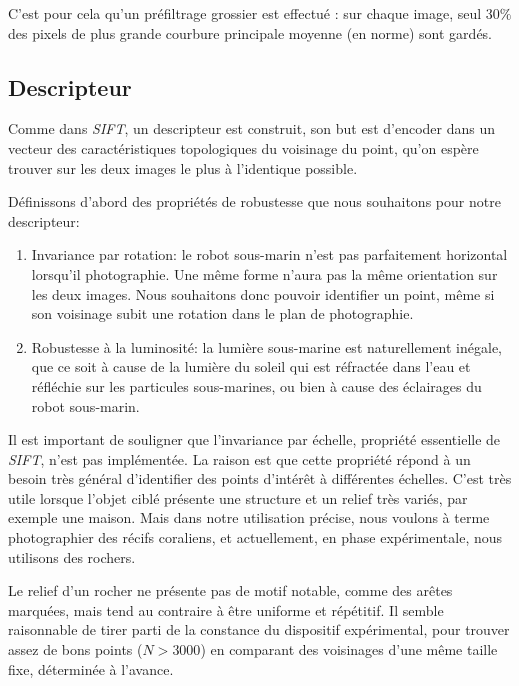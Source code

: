 \documentclass[
	a4paper, %
	10pt, %
	unnumberedsections, %
	twoside, %
]{LTJournalArticle}
\begin{document}
C'est pour cela qu'un préfiltrage grossier est effectué : sur chaque image,
seul $30 \%$ des pixels de plus grande courbure principale moyenne (en norme)
sont gardés.

\subsection{Descripteur}\label{subsection:descripteur}
Comme dans \textit{SIFT}, un descripteur est construit,
son but est d'encoder dans un vecteur des caractéristiques topologiques du voisinage du point, qu'on espère trouver
sur les deux images le plus à l'identique possible.

Définissons d'abord des propriétés de robustesse
que nous souhaitons pour notre descripteur:

\begin{enumerate}
	\item Invariance par rotation: le robot sous-marin n'est pas parfaitement
	      horizontal lorsqu'il photographie. Une même forme n'aura pas la même
	      orientation sur les deux images. Nous souhaitons donc pouvoir identifier un
	      point, même si son voisinage subit une rotation dans le plan de photographie.
	\item Robustesse à la luminosité: la lumière sous-marine est naturellement inégale,
	      que ce soit à cause de la lumière du soleil qui est réfractée dans l'eau
	      et réfléchie sur les particules sous-marines, ou bien à
	      cause des éclairages du robot sous-marin.
\end{enumerate}

Il est important de souligner que l'invariance par échelle, propriété essentielle de \textit{SIFT},
n'est pas implémentée. La raison est que cette propriété
répond à un besoin très général d'identifier des points d'intérêt à différentes
échelles. C'est très utile lorsque l'objet ciblé présente une structure et
un relief très variés, par exemple une maison. Mais dans notre utilisation précise,
nous voulons à terme photographier des récifs coraliens, et actuellement, en
phase expérimentale, nous utilisons des rochers.

Le relief d'un rocher ne présente
pas de motif notable, comme des arêtes marquées, mais tend au contraire à être
uniforme et répétitif. Il semble raisonnable de tirer parti de la
constance du dispositif expérimental, pour trouver assez de bons points ($N > 3000$)
en comparant des voisinages d'une même taille fixe, déterminée à l'avance.
\end{document}
